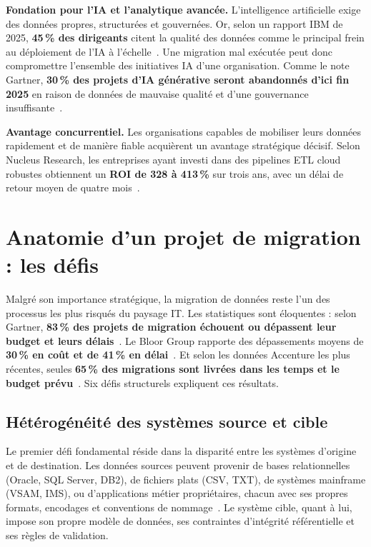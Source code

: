 \textbf{Fondation pour l'IA et l'analytique avancée.} L'intelligence
artificielle exige des données propres, structurées et gouvernées. Or,
selon un rapport IBM de 2025, \textbf{45\,\% des dirigeants} citent la
qualité des données comme le principal frein au déploiement de l'IA à
l'échelle~\cite{ibm_data_quality}. Une migration mal exécutée peut donc
compromettre l'ensemble des initiatives IA d'une organisation. Comme le
note Gartner, \textbf{30\,\% des projets d'IA générative seront abandonnés
d'ici fin 2025} en raison de données de mauvaise qualité et d'une
gouvernance insuffisante~\cite{forbes_bad_data}.

\textbf{Avantage concurrentiel.} Les organisations capables de mobiliser
leurs données rapidement et de manière fiable acquièrent un avantage
stratégique décisif. Selon Nucleus Research, les entreprises ayant investi
dans des pipelines ETL cloud robustes obtiennent un \textbf{ROI de 328 à
413\,\%} sur trois ans, avec un délai de retour moyen de quatre
mois~\cite{integrate_io_etl}.

\section{Anatomie d'un projet de migration : les défis}

Malgré son importance stratégique, la migration de données reste l'un des
processus les plus risqués du paysage IT. Les statistiques sont éloquentes :
selon Gartner, \textbf{83\,\% des projets de migration échouent ou dépassent
leur budget et leurs délais}~\cite{kaopiz2025, kanerika2025}. Le Bloor Group
rapporte des dépassements moyens de \textbf{30\,\% en coût et de 41\,\% en
délai}~\cite{vovance_medium}. Et selon les données Accenture les plus
récentes, seules \textbf{65\,\% des migrations sont livrées dans les temps
et le budget prévu}~\cite{medhacloud2026}. Six défis structurels expliquent
ces résultats.

\subsection{Hétérogénéité des systèmes source et cible}

Le premier défi fondamental réside dans la disparité entre les systèmes
d'origine et de destination. Les données sources peuvent provenir de bases
relationnelles (Oracle, SQL Server, DB2), de fichiers plats (CSV, TXT), de
systèmes mainframe (VSAM, IMS), ou d'applications métier propriétaires,
chacun avec ses propres formats, encodages et conventions de
nommage~\cite{admp_presentation}. Le système cible, quant à lui, impose
son propre modèle de données, ses contraintes d'intégrité référentielle et
ses règles de validation.

